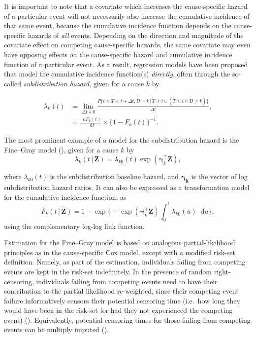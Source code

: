 \documentclass[
  letterpaper,
  DIV=11,
  numbers=noendperiod]{scrreprt}
\newcommand{\given}{\,|\,}
\newcommand\diff{\mathop{}\!\mathrm{d}}
\begin{document}
It is important to note that a covariate which increases the
cause-specific hazard of a particular event will not necessarily also
increase the cumulative incidence of that same event, because the
cumulative incidence function depends on the cause-specific hazards of
\emph{all} events. Depending on the direction and magnitude of the
covariate effect on competing cause-specific hazards, the same covariate
may even have opposing effects on the cause-specific hazard and
cumulative incidence function of a particular event. As a result,
regression models have been proposed that model the cumulative incidence
function(s) \emph{directly}, often through the so-called
\emph{subdistribution hazard}, given for a cause \(k\) by

\[
\begin{aligned}
    \lambda_k(t) &= \lim_{\Delta t \downarrow 0} \frac{P\{t \leq \tilde{T} < t + \Delta t, \tilde{D} = k \given \tilde{T} \geq t \cup (\tilde{T} \leq t \cap \tilde{D} \neq k)\}}{\Delta t}, \\
    &= \frac{\diff F_k(t)}{\diff t} \times \{1 - F_k(t)\}^{-1}.
\end{aligned}
\]

The most prominent example of a model for the subdistribution hazard is
the Fine--Gray model
(),
given for a cause \(k\) by \[
\lambda_k(t \given \mathbf{Z}) = \lambda_{k0}(t)\exp(\boldsymbol{\gamma}_k^\intercal \mathbf{Z}),
\]

where \(\lambda_{k0}(t)\) is the subdistribution baseline hazard, and
\(\boldsymbol{\gamma_k}\) is the vector of log subdistribution hazard
ratios. It can also be expressed as a transformation model for the
cumulative incidence function, as \[
F_k(t \given \mathbf{Z}) = 1 - \exp \Biggl\{ -\exp(\boldsymbol{\gamma}_k^\intercal \mathbf{Z}) \int_{0}^{t} \lambda_{k0}(u)\diff u \Biggr\},
\] using the complementary log-log link function.

Estimation for the Fine--Gray model is based on analogous
partial-likelihood principles as in the cause-specific Cox model, except
with a modified risk-set definition. Namely, as part of the estimation,
individuals failing from competing events are kept in the risk-set
indefinitely. In the presence of random right-censoring, individuals
failing from competing events need to have their contribution to the
partial likelihood re-weighted, since their competing event failure
informatively censors their potential censoring time (i.e.~how long they
would have been in the risk-set for had they not experienced the
competing event)
(). Equivalently, potential censoring times for those failing from
competing events can be multiply imputed
().
\end{document}
